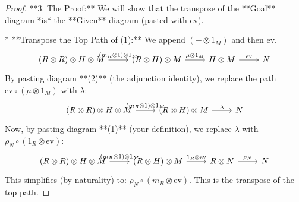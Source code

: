 \documentclass[11pt, letterpaper]{article}
\begin{document}
\begin{proof}
**3. The Proof:**
We will show that the transpose of the **Goal** diagram *is* the **Given** diagram (pasted with $\mathrm{ev}$).

* **Transpose the Top Path of (1):**
    We append $(-\otimes 1_M)$ and then $\mathrm{ev}$.
    $$
    \begin{tikzcd}
    (R \otimes R) \otimes H \otimes M \ar[r, "(m_R \otimes 1) \otimes 1_M"] & (R \otimes H) \otimes M \ar[r, "\mu \otimes 1_M"] & H \otimes M \ar[r, "\mathrm{ev}"] & N
    \end{tikzcd}
    $$
    By pasting diagram **(2)** (the adjunction identity), we replace the path $\mathrm{ev} \circ (\mu \otimes 1_M)$ with $\lambda$:
    $$
    \begin{tikzcd}
    (R \otimes R) \otimes H \otimes M \ar[r, "(m_R \otimes 1) \otimes 1_M"] & (R \otimes H) \otimes M \ar[r, "\lambda"] & N
    \end{tikzcd}
    $$
    Now, by pasting diagram **(1)** (your definition), we replace $\lambda$ with $\rho_N \circ (1_R \otimes \mathrm{ev})$:
    $$
    \begin{tikzcd}
    (R \otimes R) \otimes H \otimes M \ar[r, "(m_R \otimes 1) \otimes 1_M"] & (R \otimes H) \otimes M \ar[r, "1_R \otimes \mathrm{ev}"] & R \otimes N \ar[r, "\rho_N"] & N
    \end{tikzcd}
    $$
    This simplifies (by naturality) to: $\rho_N \circ (m_R \otimes \mathrm{ev})$. This is the transpose of the top path.


\end{proof}
\end{document}
